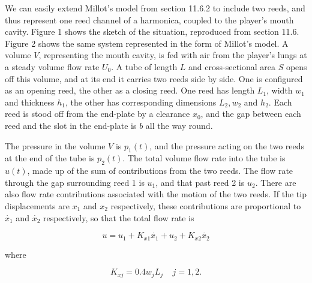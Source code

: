   We can easily extend Millot's model from section 11.6.2 to include two reeds, 
  and thus represent one reed channel of a harmonica, coupled to the player's 
  mouth cavity. Figure 1 shows the sketch of the situation, reproduced from 
  section 11.6. Figure 2 shows the same system represented in the form of 
  Millot's model. A volume $V$, representing the mouth cavity, is fed with air 
  from the player's lungs at a steady volume flow rate $U_0$. A tube of length 
  $L$ and cross-sectional area $S$ opens off this volume, and at its end it 
  carries two reeds side by side. One is configured as an opening reed, the 
  other as a closing reed. One reed has length $L_1$, width $w_1$ and thickness 
  $h_1$, the other has corresponding dimensions $L_2, w_2$ and $h_2$. Each reed 
  is stood off from the end-plate by a clearance $x_0$, and the gap between 
  each reed and the slot in the end-plate is $b$ all the way round. 



  The pressure in the volume $V$ is $p_1(t)$, and the pressure acting on the 
  two reeds at the end of the tube is $p_2(t)$. The total volume flow rate into 
  the tube is $u(t)$, made up of the sum of contributions from the two reeds. 
  The flow rate through the gap surrounding reed 1 is $u_1$, and that past reed 
  2 is $u_2$. There are also flow rate contributions associated with the motion 
  of the two reeds. If the tip displacements are $x_1$ and $x_2$ respectively, 
  these contributions are proportional to $\dot{x_1}$ and $\dot{x_2}$ 
  respectively, so that the total flow rate is 

  \begin{equation*}u=u_1+K_{x1} \dot{x_1} + u_2 +K_{x2} \dot{x_2} 
  \tag{1}\end{equation*} 

  \noindent{}where 

  \begin{equation*}K_{xj}=0.4 w_j L_j \mathrm{~~~~~} j=1,2. 
  \tag{2}\end{equation*} 

